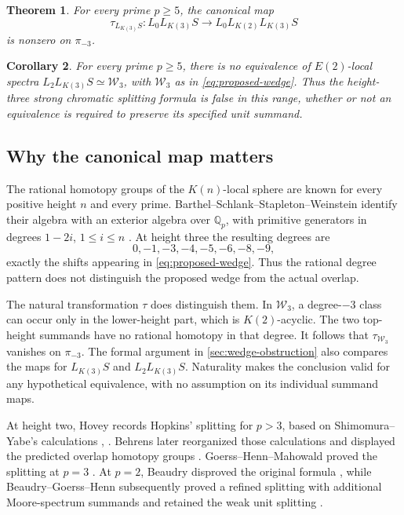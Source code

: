 \documentclass[11pt]{article}
\numberwithin{equation}{section}
\newtheorem{theorem}{Theorem}[section]
\newtheorem{corollary}[theorem]{Corollary}
\theoremstyle{definition}
\theoremstyle{remark}
\newcommand{\Q}{\mathbb Q}
\begin{document}
\begin{theorem}\label{thm:main}
For every prime \(p\geq5\), the canonical map
\begin{equation}\label{eq:main-map}
 \tau_{L_{K(3)}S}:L_0L_{K(3)}S\longrightarrow
                         L_0L_{K(2)}L_{K(3)}S
\end{equation}
is nonzero on \(\pi_{-3}\).
\end{theorem}

\begin{corollary}\label{cor:strong}
For every prime \(p\geq5\), there is no equivalence of \(E(2)\)-local
spectra \(L_2L_{K(3)}S\simeq\mathcal W_3\), with \(\mathcal W_3\) as in
\eqref{eq:proposed-wedge}. Thus the height-three strong chromatic
splitting formula is false in this range, whether or not an equivalence
is required to preserve its specified unit summand.
\end{corollary}

\subsection{Why the canonical map matters}

The rational homotopy groups of the \(K(n)\)-local sphere are known
for every positive height \(n\) and every prime. Barthel--Schlank--Stapleton--Weinstein
identify their algebra with an exterior algebra over \(\Q_p\), with
primitive generators in degrees \(1-2i\), \(1\leq i\leq n\)
\cite[Theorem~A]{BSSW2025}. At height three the resulting degrees are
\[
 0,-1,-3,-4,-5,-6,-8,-9,
\]
exactly the shifts appearing in \eqref{eq:proposed-wedge}. Thus the
rational degree pattern does not distinguish the proposed wedge from
the actual overlap.

The natural transformation \(\tau\) does distinguish them. In
\(\mathcal W_3\), a degree-\(-3\) class can occur only in the
lower-height part, which is \(K(2)\)-acyclic. The two top-height
summands have no rational homotopy in that degree. It follows that
\(\tau_{\mathcal W_3}\) vanishes on \(\pi_{-3}\). The formal argument
in \cref{sec:wedge-obstruction} also compares the maps for
\(L_{K(3)}S\) and \(L_2L_{K(3)}S\). Naturality makes the conclusion
valid for any hypothetical equivalence, with no assumption on its
individual summand maps.

At height two, Hovey records Hopkins' splitting
for \(p>3\), based on Shimomura--Yabe's calculations
\cite[\S4]{Hovey1995}, \cite[Theorem~2.4]{ShimomuraYabe1995}. Behrens later reorganized those calculations
and displayed the predicted overlap homotopy groups
\cite[Remark~7.8]{Behrens2012}. Goerss--Henn--Mahowald proved the
splitting at \(p=3\) \cite[Theorem~5.11]{GHM2014}. At \(p=2\),
Beaudry disproved the original formula \cite[Theorem~1.4]{Beaudry2017},
while Beaudry--Goerss--Henn subsequently proved a refined splitting
with additional Moore-spectrum summands and retained the weak unit
splitting \cite[Theorem~1.1.6]{BGH2022}.
\end{document}
